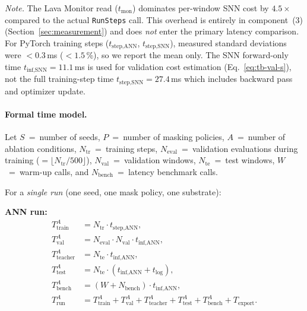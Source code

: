 \documentclass[11pt,a4paper]{article}
\begin{document}
\noindent\emph{Note.}
The Lava Monitor read ($t_{\text{mon}}$) dominates per-window SNN
cost by $4.5\times$ compared to the actual \texttt{RunSteps} call.
This overhead is entirely in component~(3)
(Section~\ref{sec:measurement}) and does \emph{not} enter the primary
latency comparison.
For PyTorch training steps ($t_{\text{step,ANN}}$,
$t_{\text{step,SNN}}$), measured standard deviations were
$< 0.3$\,ms ($< 1.5$\,\%), so we report the mean only.
The SNN forward-only time $t_{\text{inf,SNN}} = 11.1$\,ms
is used for validation cost estimation
(Eq.~\ref{eq:tb-val-s}), not the full training-step time
$t_{\text{step,SNN}} = 27.4$\,ms which includes backward pass
and optimizer update.

\paragraph{Formal time model.}\label{par:time-model}
Let $S$~=~number of seeds, $P$~=~number of masking policies,
$A$~=~number of ablation conditions,
$N_{\text{tr}}$~=~training steps,
$N_{\text{eval}}$~=~validation evaluations during training
($= \lfloor N_{\text{tr}} / 500 \rfloor$),
$N_{\text{val}}$~=~validation windows,
$N_{\text{te}}$~=~test windows,
$W$~=~warm-up calls, and $N_{\text{bench}}$~=~latency benchmark calls.

For a \emph{single run} (one seed, one mask policy, one substrate):

\medskip\noindent
\textbf{ANN run:}
\begin{align}
  T_{\text{train}}^{A}
    &= N_{\text{tr}} \cdot t_{\text{step,ANN}}, \label{eq:tb-train-a} \\
  T_{\text{val}}^{A}
    &= N_{\text{eval}} \cdot N_{\text{val}} \cdot t_{\text{inf,ANN}},
       \label{eq:tb-val-a} \\
  T_{\text{teacher}}^{A}
    &= N_{\text{te}} \cdot t_{\text{inf,ANN}}, \label{eq:tb-teacher} \\
  T_{\text{test}}^{A}
    &= N_{\text{te}} \cdot
       (t_{\text{inf,ANN}} + t_{\text{log}}), \label{eq:tb-test-a} \\
  T_{\text{bench}}^{A}
    &= (W + N_{\text{bench}}) \cdot t_{\text{inf,ANN}},
       \label{eq:tb-bench-a} \\
  T_{\text{run}}^{A}
    &= T_{\text{train}}^{A} + T_{\text{val}}^{A}
     + T_{\text{teacher}}^{A} + T_{\text{test}}^{A}
     + T_{\text{bench}}^{A} + T_{\text{export}}.
       \label{eq:tb-run-a}
\end{align}
\end{document}
